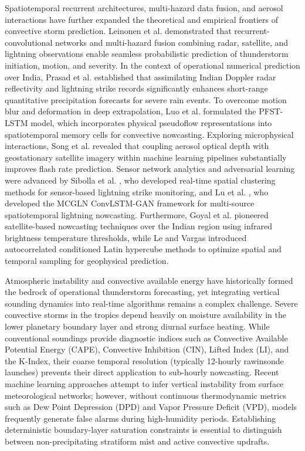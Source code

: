\documentclass[12pt,a4paper]{report}
\begin{document}
Spatiotemporal recurrent architectures, multi-hazard data fusion, and aerosol interactions have further expanded the theoretical and empirical frontiers of convective storm prediction. Leinonen et al. \cite{leinonen2022seamless, leinonen2022nowcasting, leinonen2023multihazard} demonstrated that recurrent-convolutional networks and multi-hazard fusion combining radar, satellite, and lightning observations enable seamless probabilistic prediction of thunderstorm initiation, motion, and severity. In the context of operational numerical prediction over India, Prasad et al. \cite{prasad2023impact} established that assimilating Indian Doppler radar reflectivity and lightning strike records significantly enhances short-range quantitative precipitation forecasts for severe rain events. To overcome motion blur and deformation in deep extrapolation, Luo et al. \cite{luo2021pfst} formulated the PFST-LSTM model, which incorporates physical pseudoflow representations into spatiotemporal memory cells for convective nowcasting. Exploring microphysical interactions, Song et al. \cite{song2023lightning} revealed that coupling aerosol optical depth with geostationary satellite imagery within machine learning pipelines substantially improves flash rate prediction. Sensor network analytics and adversarial learning were advanced by Sibolla et al. \cite{sibolla2021determining}, who developed real-time spatial clustering methods for sensor-based lightning strike monitoring, and Lu et al. \cite{lu2023mcgln}, who developed the MCGLN ConvLSTM-GAN framework for multi-source spatiotemporal lightning nowcasting. Furthermore, Goyal et al. \cite{goyal2017satellite} pioneered satellite-based nowcasting techniques over the Indian region using infrared brightness temperature thresholds, while Le and Vargas \cite{le2024autocorrelated} introduced autocorrelated conditioned Latin hypercube methods to optimize spatial and temporal sampling for geophysical prediction.

Atmospheric instability and convective available energy have historically formed the bedrock of operational thunderstorm forecasting, yet integrating vertical sounding dynamics into real-time algorithms remains a complex challenge. Severe convective storms in the tropics depend heavily on moisture availability in the lower planetary boundary layer and strong diurnal surface heating. While conventional soundings provide diagnostic indices such as Convective Available Potential Energy (CAPE), Convective Inhibition (CIN), Lifted Index (LI), and the K-Index, their coarse temporal resolution (typically 12-hourly rawinsonde launches) prevents their direct application to sub-hourly nowcasting. Recent machine learning approaches attempt to infer vertical instability from surface meteorological networks; however, without continuous thermodynamic metrics such as Dew Point Depression (DPD) and Vapor Pressure Deficit (VPD), models frequently generate false alarms during high-humidity periods. Establishing deterministic boundary-layer saturation constraints is essential to distinguish between non-precipitating stratiform mist and active convective updrafts.
\end{document}
